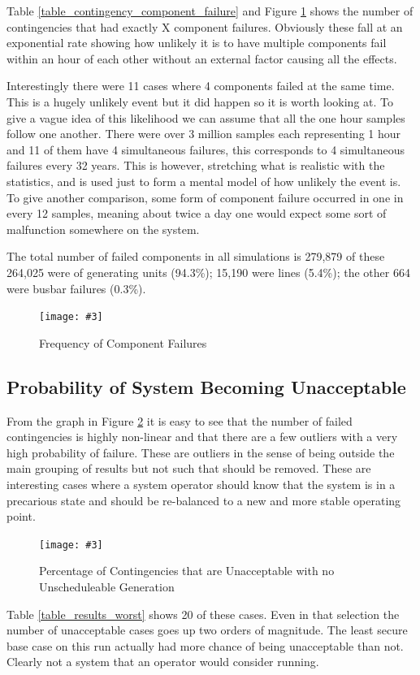\documentclass[a4paper,oneside,12pt]{report}
\newcommand{\image}[3] {
  \begin{figure}
    \begin{center}
      \texttt{[image: \#3]}
      \caption{#2}
      \label{#1}
    \end{center}
  \end{figure}
}
\begin{document}
Table \ref{table_contingency_component_failure} and Figure \ref{contingencyfailfreq} shows the number of contingencies that had exactly X component failures. Obviously these fall at an exponential rate showing how unlikely it is to have multiple components fail within an hour of each other without an external factor causing all the effects. 

Interestingly there were 11 cases where 4 components failed at the same time. This is a hugely unlikely event but it did happen so it is worth looking at. To give a vague idea of this likelihood we can assume that all the one hour samples follow one another. There were over 3 million samples each representing 1 hour and 11 of them have 4 simultaneous failures, this corresponds to 4 simultaneous failures every 32 years. This is however, stretching what is realistic with the statistics, and is used just to form a mental model of how unlikely the event is. To give another comparison, some form of component failure occurred in one in every 12 samples, meaning about twice a day one would expect some sort of malfunction somewhere on the system.

The total number of failed components in all simulations is 279,879 of these 264,025 were of generating units (94.3\%); 15,190 were lines (5.4\%); the other 664 were busbar failures (0.3\%). 

\image{contingencyfailfreq}{Frequency of Component Failures}{contingencyfailfreq.png}

\subsection{Probability of System Becoming Unacceptable}

From the graph in Figure \ref{probacceptable} it is easy to see that the number of failed contingencies is highly non-linear and that there are a few outliers with a very high probability of failure. These are outliers in the sense of being outside the main grouping of results but not such that should be removed. These are interesting cases where a system operator should know that the system is in a precarious state and should be re-balanced to a new and more stable operating point.

\image{probacceptable}{Percentage of Contingencies that are Unacceptable with no Unscheduleable Generation}{probacceptable.png}

Table \ref{table_results_worst} shows 20 of these cases. Even in that selection the number of unacceptable cases goes up two orders of magnitude. The least secure base case on this run actually had more chance of being unacceptable than not. Clearly not a system that an operator would consider running.
\end{document}
